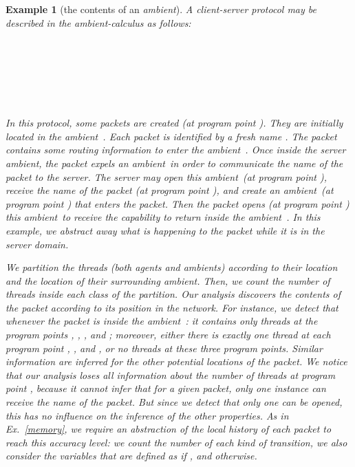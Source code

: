 \documentclass{article}
\newcommand{\boxexample}{}
\newtheorem{example}[thm]{Example}
\newcommand{\ambient}{\emph{ambient}}
\newcommand{\ambients}{\emph{ambients}}
\newcommand{\pp}[1]{}
\newcommand{\pps}[1]{(at program point \pp{#1})}
\newcommand{\amblabb}{2}
\newcommand{\amblabc}{3}
\newcommand{\amblabd}{4}
\newcommand{\amblabj}{10}
\newcommand{\amblabk}{11}
\newcommand{\amblabl}{12}
\newcommand{\amblabm}{13}
\begin{document}
\begin{example}[the contents of an \ambient]
\label{content}
A \emph{client-server} protocol  may be described in the \ambient-calculus as follows:
\begin{tabbing}
\\
\=\=\\
\>\>\=\\
\=\=\=\=\\
\>\>\>\\
\>\>
\end{tabbing}
In this protocol, some packets are created \pps{\amblabj}. They are initially located in the \ambient\ . Each packet is identified by a fresh name . The packet contains some routing information to enter the \ambient\ . Once inside the server \ambient, the packet expels an \ambient\  in order to communicate the name of the packet to the server.
The server may open this \ambient\ \pps{\amblabb}, receive the name of the packet \pps{\amblabc}, and create an \ambient\ \pps{\amblabd} that enters the packet. Then the packet opens \pps{\amblabl} this \ambient\ to receive the capability to return inside the \ambient\ .
In this example, we abstract away what is happening to the packet while it is in the server domain. 


We partition the threads (both agents and \ambients) according to their location and the location of their surrounding \ambient. 
Then, we count the number of threads inside each class of the partition.
Our analysis discovers   the contents of the packet according to its position in the network. 
For instance, we detect that whenever the packet is inside the \ambient\ : 
it contains only threads at the program points \pp{\amblabd}, \pp{\amblabk}, \pp{\amblabl}, and \pp{\amblabm}; 
moreover, either there is exactly one thread 
at each program point \pp{\amblabk}, \pp{\amblabl}, and \pp{\amblabm}, or 
no threads at these three program points.
Similar information are inferred for the other potential locations of the packet.
We notice that our analysis loses all information about the number of threads at program point \pp{\amblabd}, because it cannot infer that for a given packet, only one instance can receive the name of the packet. But since we detect that only one can be opened, this has no influence on the inference of the other properties.
As in Ex.~\ref{memory}, we require an abstraction of the local history of each packet to reach this accuracy level:
we count the number  of each kind  of transition,
 we also consider the variables  that are defined as  if , and  otherwise. \boxexample
\end{example}
\end{document}
